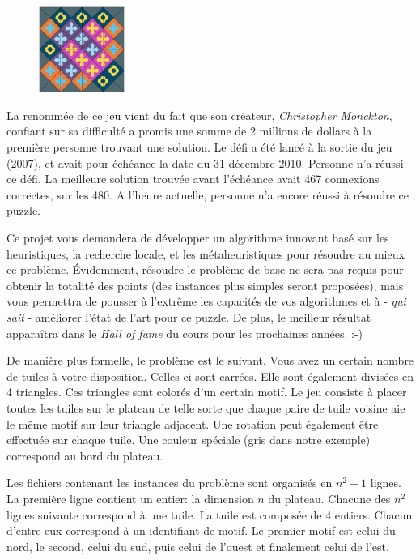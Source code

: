\documentclass[a4paper,11pt,final,fleqn]{article}
\begin{document}
\begin{figure}[!ht]
\centering
\includegraphics[width=0.25\textwidth]{img/eternity}
\end{figure}


La renommée de ce jeu vient du fait que son créateur, \textit{Christopher Monckton}, confiant sur sa difficulté a promis une somme de 2 millions de dollars à 
la première personne trouvant une solution. Le défi a été lancé à la sortie du jeu (2007), et avait pour échéance la date du 31 décembre 2010. Personne 
n'a réussi ce défi. La meilleure solution trouvée avant l'échéance avait 467 connexions correctes, sur les 480. A l'heure actuelle, personne n'a encore 
réussi à résoudre ce puzzle. 

Ce projet vous demandera de développer un algorithme innovant basé sur les heuristiques, la recherche locale, et les métaheuristiques pour résoudre au mieux 
ce problème. Évidemment, résoudre le problème de base ne sera pas requis pour obtenir la totalité des points (des instances plus simples seront proposées), 
mais vous permettra de pousser à l'extrême les capacités de vos algorithmes et à - \textit{qui sait} - améliorer l'état de l'art pour ce puzzle. 
De plus, le meilleur résultat apparaîtra dans le \textit{Hall of fame} du cours pour les prochaines années. :-)

De manière plus formelle, le problème est le suivant. Vous avez un certain nombre de tuiles à votre disposition. Celles-ci sont carrées. 
Elle sont également divisées en 4 triangles. Ces triangles sont colorés d'un certain motif. Le jeu consiste à placer toutes les tuiles sur le plateau de 
telle sorte que chaque paire de tuile voisine aie le même motif sur leur triangle adjacent. Une rotation peut également être effectuée sur chaque tuile. 
Une couleur spéciale (gris dans notre exemple) correspond au bord du plateau.

Les fichiers contenant les instances du problème sont organisés en $n^2+1$ lignes.
La première ligne contient un entier: la dimension $n$ du plateau.
Chacune des $n^2$ lignes suivante correspond à une tuile. La tuile est composée de 4 entiers. Chacun d'entre eux correspond à un identifiant de motif. 
Le premier motif est celui du nord, le second, celui du sud, puis celui de l'ouest et finalement celui de l'est.
\end{document}
